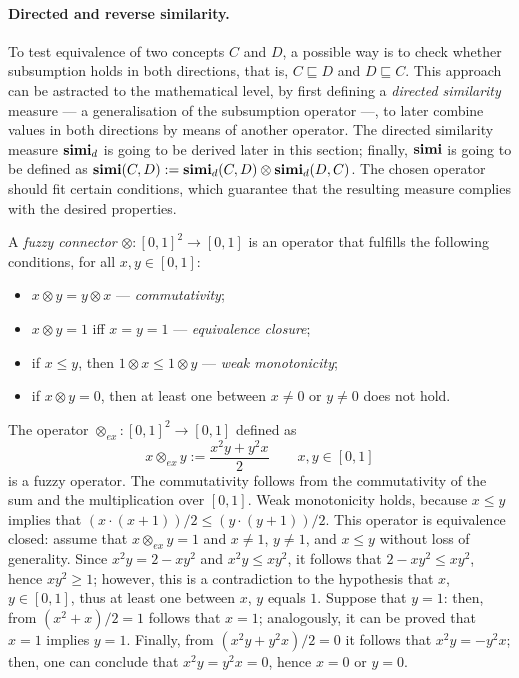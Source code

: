   \paragraph{Directed and reverse similarity.}
  To test equivalence of two concepts \(C\) and \(D\), a possible way is to check whether subsumption holds in both directions, that is, \(C \sqsubseteq D\) and \(D \sqsubseteq C\).
  This approach can be astracted to the mathematical level, by first defining a \emph{directed similarity} measure --- a generalisation of the subsumption operator ---, to later combine values in both directions by means of another operator.
  The directed similarity measure \(\mathbf{simi}_d\) is going to be derived later in this section; finally, \(\mathbf{simi}\) is going to be defined as \(\mathbf{simi}(C,D) := \mathbf{simi}_d(C,D) \otimes \mathbf{simi}_d(D,C)\).
  The chosen operator should fit certain conditions, which guarantee that the resulting measure complies with the desired properties.
  \begin{definition}
    A \emph{fuzzy connector} \(\otimes \colon {[0,1]}^2 \to [0,1]\) is an operator that fulfills the following conditions, for all \(x, y \in [0,1]\):
    \begin{itemize}
      \item \(x \otimes y = y \otimes x\) --- \emph{commutativity};
      \item \(x \otimes y = 1\) iff \(x = y = 1\) --- \emph{equivalence closure};
      \item if \(x \le y\), then \(1 \otimes x \le 1 \otimes y\) --- \emph{weak monotonicity};
      \item if \(x \otimes y = 0\), then at least one between \(x \ne 0\) or \(y \ne 0\) does not hold.
    \end{itemize}
  \end{definition}

  \begin{example}
    The operator \(\otimes_{ex} \colon {[0,1]}^2 \to [0,1]\) defined as
    \[
    x \otimes_{ex} y := \frac{x^2y + y^2x}{2} \qquad x,y \in [0,1]
    \]
    is a fuzzy operator.
    The commutativity follows from the commutativity of the sum and the multiplication over \([0,1]\). Weak monotonicity holds, because \(x \le y\) implies that \((x \cdot (x+1))/2 \le (y \cdot (y+1))/2\).
    This operator is equivalence closed: assume that \(x \otimes_{ex} y = 1\) and \(x \ne 1\), \(y \ne 1\), and \(x \le y\) without loss of generality.
    Since \(x^2y = 2 - xy^2\) and \(x^2y \le xy^2\), it follows that \(2-xy^2 \le xy^2\), hence \(xy^2 \ge 1\); however, this is a contradiction to the hypothesis that \(x\), \(y \in [0,1]\), thus at least one between \(x\), \(y\) equals \(1\).
    Suppose that \(y = 1\): then, from \((x^2 + x)/2 = 1\) follows that \(x = 1\); analogously, it can be proved that \(x = 1\) implies \(y = 1\).
  Finally, from \((x^2y + y^2x)/2 = 0\) it follows that \(x^2y = - y^2x\); then, one can conclude that \(x^2y = y^2x = 0\), hence \(x = 0\) or \(y = 0\).
\end{example}
  
